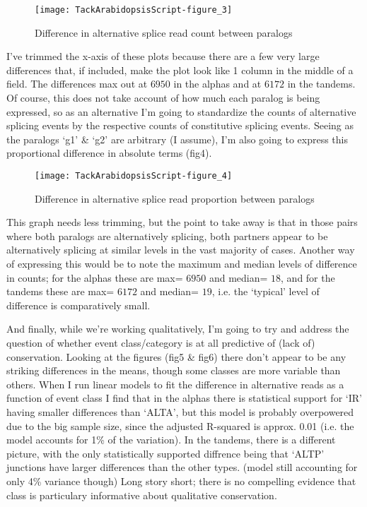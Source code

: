 \documentclass{article}
\begin{document}
\begin{figure}[h]
\begin{center}
\texttt{[image: TackArabidopsisScript-figure\_3]}
\end{center}
\caption{Difference in alternative splice read count between paralogs}
\label{fig:fig3}
\end{figure}


I've trimmed the x-axis of these plots because there are a few very large differences that, if included, make the plot look like 1 column in the middle of a field. The differences max out at $6950$ in the alphas and at $6172$ in the tandems. Of course, this does not take account of how much each paralog is being expressed, so as an alternative I'm going to standardize the counts of alternative splicing events by the respective counts of constitutive splicing events. Seeing as the paralogs `g1' \& `g2' are arbitrary (I assume), I'm also going to express this proportional difference in absolute terms (fig4).\

\begin{figure}[h]
\begin{center}
\texttt{[image: TackArabidopsisScript-figure\_4]}
\end{center}
\caption{Difference in alternative splice read proportion between paralogs}
\label{fig:fig4}
\end{figure}

This graph needs less trimming, but the point to take away is that in those pairs where both paralogs are alternatively splicing, both partners appear to be alternatively splicing at similar levels in the vast majority of cases. Another way of expressing this would be to note the maximum and median levels of difference in counts; for the alphas these are max= $6950$ and median= $18$, and for the tandems these are max= $6172$ and median= $19$, i.e. the `typical' level of difference is comparatively small.\

And finally, while we're working qualitatively, I'm going to try and address the question of whether event class/category is at all predictive of (lack of) conservation. Looking at the figures (fig5 \& fig6) there don't appear to be any striking differences in the means, though some classes are more variable than others. When I run linear models to fit the difference in alternative reads as a function of event class I find that in the alphas there is statistical support for `IR' having smaller differences than `ALTA', but this model is probably overpowered due to the big sample size, since the adjusted R-squared is approx. 0.01 (i.e. the model accounts for 1\% of the variation). In the tandems, there is a different picture, with the only statistically supported diffrence being that `ALTP' junctions have larger differences than the other types. (model still accounting for only 4\% variance though) Long story short; there is no compelling evidence that class is particulary informative about qualitative conservation.\
\end{document}
